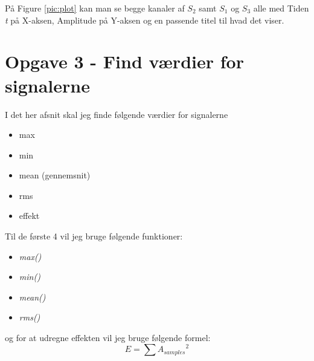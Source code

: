 \documentclass[../main.tex]{subfiles}
\begin{document}
På Figure \ref{pic:plot} kan man se begge kanaler af $S_2$ samt $S_1$ og $S_3$ alle med Tiden \textit{t} på X-aksen, Amplitude på Y-aksen og en passende titel til hvad det viser.


\section{Opgave 3 - Find værdier for signalerne}
I det her afsnit skal jeg finde følgende værdier for signalerne
\begin{itemize}
    \item max
    \item min
    \item mean (gennemsnit)
    \item rms
    \item effekt
\end{itemize}

Til de første 4 vil jeg bruge følgende funktioner:
\begin{itemize}
    \item \textit{max()}
    \item \textit{min()}
    \item \textit{mean()}
    \item \textit{rms()}
\end{itemize}

og for at udregne effekten vil jeg bruge følgende formel:
\[E = \sum {A_{samples}}^2\]
\end{document}
